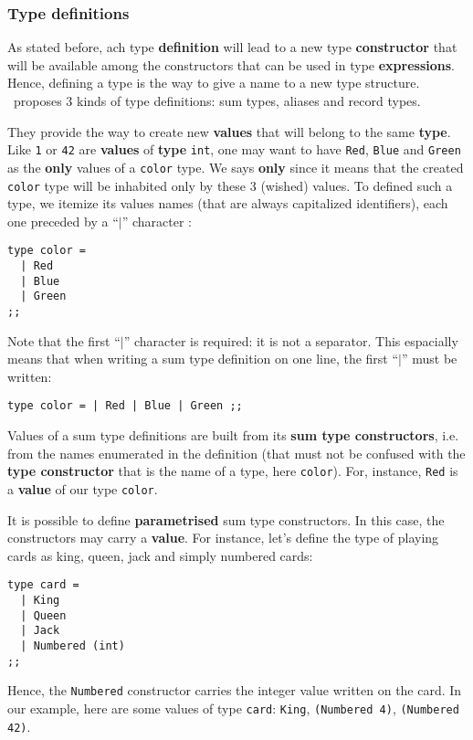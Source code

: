 \subsubsection{Type definitions}
As stated before, ach type {\bf definition} will lead to a new type
{\bf constructor} that will be available among the constructors that
can be used in type {\bf expressions}. Hence, defining a type is the
way to give a name to a new type structure. \focal\ proposes 3 kinds
of type definitions: sum types, aliases and record types.



\vspace{0.5cm}

They provide the way to create new {\bf values} that
will belong to the same {\bf type}. Like {\tt 1} or {\tt 42} are
{\bf values} of {\bf type} {\tt int}, one may want to have {\tt Red},
{\tt Blue} and {\tt Green} as the {\bf only} values of a {\tt color}
type. We says {\bf only} since it means that the created {\tt color}
type will be inhabited only by these 3 (wished) values. To defined
such a type, we itemize its values names (that are always capitalized
identifiers), each one preceded by a ``$\mid$'' character :
{\scriptsize
\begin{lstlisting}
type color =
  | Red
  | Blue
  | Green
;;
\end{lstlisting}
}
Note that the first ``$\mid$'' character is required: it is not a
separator. This espacially means that when writing a sum type
definition on one line, the first ``$\mid$'' must be written:
{\scriptsize
\begin{lstlisting}
type color = | Red | Blue | Green ;;
\end{lstlisting}
}
Values of a sum type definitions are built from its
{\bf sum type constructors}, i.e. from the names enumerated in the
definition (that must not be confused with the {\bf type constructor}
that is the name of a type, here {\tt color}). For, instance,
{\tt Red} is a {\bf value} of our type {\tt color}.

It is possible to define {\bf parametrised} sum type constructors. In
this case, the constructors may carry a {\bf value}. For instance,
let's define the type of playing cards as king, queen, jack and simply
numbered cards:
{\scriptsize
\begin{lstlisting}
type card =
  | King
  | Queen
  | Jack
  | Numbered (int)
;;
\end{lstlisting}
}
Hence, the {\tt Numbered} constructor carries the integer value
written on the card. In our example, here are some values of type
{\tt card}: {\tt King}, {\tt (Numbered 4)}, {\tt (Numbered 42)}.

